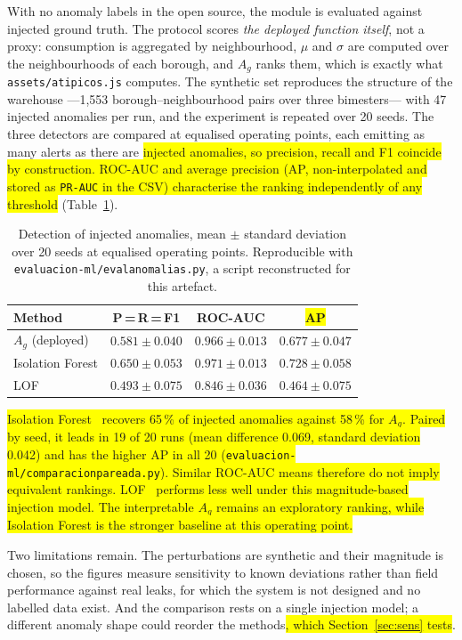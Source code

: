 \documentclass[runningheads]{llncs}
\newif\ifmarcarcambios
\newcommand{\icokg}[1]{\ifmarcarcambios\textcolor{nuevo}{#1}\else#1\fi}
\newcommand{\nuevo}[1]{\colorbox{yellow}{#1}}
\renewcommand{\_}{\origunderscore\allowbreak}
\begin{document}
With no anomaly labels in the open source, the module is evaluated against
injected ground truth. \icokg{The protocol scores \emph{the deployed
function itself}, not a proxy: consumption is aggregated by neighbourhood, $\mu$
and $\sigma$ are computed over the neighbourhoods of each borough, and $A_g$
ranks them, which is exactly what \texttt{assets/atipicos.js} computes. The
synthetic set reproduces the structure of the warehouse ---1,553
borough--neighbourhood pairs over three bimesters--- with 47 injected anomalies
per run, and the experiment is repeated over 20 seeds. The three detectors are
compared at equalised operating points, each emitting as many alerts as there are
\nuevo{injected anomalies, so precision, recall and F1 coincide by construction.
ROC-AUC and average precision (AP, non-interpolated and stored as \texttt{PR-AUC}
in the CSV) characterise the ranking independently of any threshold}
(Table~\ref{tab:eval_ml}).}

\begin{table}[tbp]
\centering
\caption{\icokg{Detection of injected anomalies, mean $\pm$ standard deviation over 20 seeds at equalised operating points. Reproducible with \texttt{evaluacion-ml/eval\_anomalias.py}, a script reconstructed for this artefact.}}
\label{tab:eval_ml}
\begin{tabular}{@{}lccc@{}}
\hline
\textbf{Method} & \textbf{P\,=\,R\,=\,F1} & \textbf{ROC-AUC} & \textbf{\nuevo{AP}} \\
\hline
$A_g$ (deployed) & $0.581\pm0.040$ & $0.966\pm0.013$ & $0.677\pm0.047$ \\
Isolation Forest & $0.650\pm0.053$ & $0.971\pm0.013$ & $0.728\pm0.058$ \\
LOF & $0.493\pm0.075$ & $0.846\pm0.036$ & $0.464\pm0.075$ \\
\hline
\end{tabular}
\end{table}

\nuevo{Isolation Forest~\cite{liu2008} recovers 65\,\% of injected anomalies against
58\,\% for $A_g$. Paired by seed, it leads in 19 of 20 runs (mean difference
0.069, standard deviation 0.042) and has the higher AP in all 20
(\texttt{evaluacion-ml/comparacion\_pareada.py}). Similar ROC-AUC means therefore do
not imply equivalent rankings. LOF~\cite{breunig2000} performs less well under this
magnitude-based injection model. The interpretable $A_g$ remains an exploratory
ranking, while Isolation Forest is the stronger baseline at this operating point.}

\icokg{Two limitations remain. The perturbations are synthetic and their magnitude
is chosen, so the figures measure sensitivity to known deviations rather than
field performance against real leaks, for which the system is not designed and no
labelled data exist. And the comparison rests on a single injection model; a
different anomaly shape could reorder the methods\nuevo{, which Section~\ref{sec:sens} tests}.}
\end{document}
